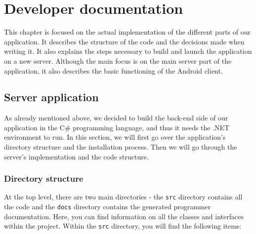 \chapter{Developer documentation}

This chapter is focused on the actual implementation of the different parts of our application. It describes the structure of the code and the decisions made when writing it. It also explains the steps necessary to build and launch the application on a new server. Although the main focus is on the main server part of the application, it also describes the basic functioning of the Android client.

\section{Server application}

As already mentioned above, we decided to build the back-end side of our application in the C\# programming language, and thus it needs the .NET environment to run. In this section, we will first go over the application's directory structure and the installation process. Then we will go through the server's implementation and the code structure.

\subsection{Directory structure}

At the top level, there are two main directories - the \texttt{src} directory contains all the code and the \texttt{docs} directory contains the generated programmer documentation. Here, you can find information on all the classes and interfaces within the project. Within the \texttt{src} directory, you will find the following items:

